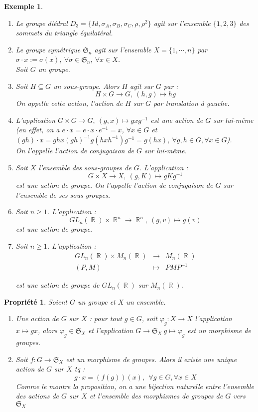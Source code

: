 \documentclass[a4paper, oneside]{report}
\theoremstyle{break}
\newtheorem{propr}[thm]{Propriété}
\newtheorem{exem}[thm]{Exemple}
\newcommand{\x}{\times}
\DeclareMathOperator{\R}{\mathbb{R}}
\renewcommand{\S}{\mathfrak{S}}
\begin{document}
\begin{exem}
	\begin{enumerate}
		\item Le groupe diédral $D_3=\{Id, \sigma_A, \sigma_B, \sigma_C, \rho, \rho^2\}$ agit sur l'ensemble $\{1,2,3\}$ des sommets du triangle équilatéral.
		\item Le groupe symétrique $\S_n$ agit sur l'ensemble $X=\{1,\cdots,n\}$ par $\sigma \cdot x := \sigma(x), ~\forall \sigma \in \S_n,~\forall x\in X$.\\
		
		Soit $G$ un groupe.
		\item Soit $H\subseteq G$ un sous-groupe. Alors $H$ agit sur $G$ par :
		$$H\x G \rightarrow G,~ (h,g)\mapsto hg$$
		On appelle cette action, l'action de $H$ sur $G$ par translation à gauche.
		\item L'application $G\x G \rightarrow G,~ (g,x) \mapsto gxg^{-1}$ est une action de $G$ sur lui-même (en effet, on a $e \cdot x = e \cdot x \cdot e^{-1} = x$, $\forall x\in G$ et $(gh) \cdot x=ghx(gh)^{-1}g(hxh^{-1})g^{-1}=g(hx),~\forall g,h\in G, \forall x\in G$).\\
		On l'appelle l'action de conjugaison de $G$ sur lui-même.
		\item Soit $X$ l'ensemble des sous-groupes de $G$. L'application :
		$$G\x X \rightarrow X,~(g,K)\mapsto gKg^{-1}$$
		est une action de groupe. On l'appelle l'action de conjugaison de $G$ sur l'ensemble de ses sous-groupes.
		\item Soit $n\geq 1$. L'application :
		$$GL_n(\R)\x \R^n \rightarrow \R^n,~(g,v)\mapsto g(v)$$
		est une action de groupe.
		\item Soit $n\geq 1$. L'application :
		$$\begin{array}{lll}
		GL_n(\R)\x M_n(\R)&\rightarrow & M_n(\R)\\
		(P,M)&\mapsto & PMP^{-1}
		\end{array}$$
		
		est une action de groupe de $GL_n(\R)$ sur $M_n(\R)$.
	\end{enumerate}
\end{exem}

\begin{propr}
	Soient $G$ un groupe et $X$ un ensemble.
	\begin{enumerate}
		\item Une action de $G$ sur $X$ : pour tout $g\in G$, soit $\varphi_g :X \rightarrow X$ l'application $x\mapsto gx$, alors $\varphi_g \in \S_X$ et l'application $G\rightarrow \S_X~g\mapsto \varphi_g$ est un morphisme de groupes.
		\item Soit $f:G\rightarrow \S_X$ est un morphisme de groupes. Alors il existe une unique action de $G$ sur $X$ tq :
		$$g \cdot x = (f(g))(x),~~\forall g\in G,\forall x\in X$$
		Comme le montre la proposition, on a une bijection naturelle entre l'ensemble des actions de $G$ sur $X$ et l'ensemble des morphismes de groupes de $G$ vers $\S_X$
	\end{enumerate}
\end{propr}
\end{document}
